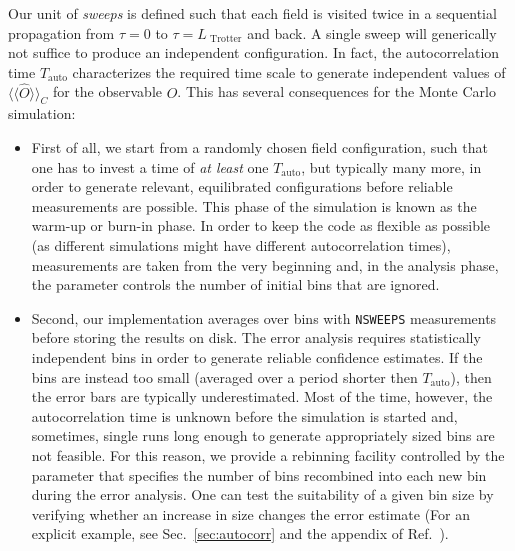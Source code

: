 Our unit of \textit{sweeps} is defined such that each field is visited twice in a sequential propagation from $\tau = 0$ to $\tau = L_{\text{ Trotter}}$ and back. A single sweep will  generically not suffice to produce an independent configuration.
In fact, the autocorrelation time $T_\mathrm{auto}$ characterizes the required time scale to generate independent values of $\langle\langle\hat{O}\rangle\rangle_C$ for the observable $O$. This has several consequences for the Monte Carlo simulation:
\begin{itemize}
	\item First of all, we start from a randomly chosen field configuration, such that one has to invest a time of \emph{at least} one $T_\mathrm{auto}$, but typically many more, in order to generate relevant, equilibrated configurations before reliable measurements are possible. This phase of the simulation is known as the warm-up or burn-in phase. In order to keep the code as flexible as possible (as different simulations might have different autocorrelation times), measurements are taken from the very beginning and, in the analysis phase, the parameter  controls the number of initial bins that are ignored.
	\item Second, our implementation averages over bins with \texttt{NSWEEPS} measurements before storing the results on disk. The  error analysis requires statistically  independent bins in order to generate reliable confidence estimates. If the bins are instead too small (averaged over a period shorter then $T_\mathrm{auto}$), then the error bars are typically underestimated. Most of the time, however, the autocorrelation time is unknown before the simulation is started and, sometimes, single runs long enough to generate appropriately sized bins are not feasible. For this reason, we provide a rebinning facility controlled by the parameter  that specifies the number of bins recombined into each new bin during the error analysis. One can test the suitability of a given bin size by verifying whether an increase in size changes the error estimate (For an explicit example, see Sec.~\ref{sec:autocorr} and the appendix of Ref.~\cite{Assaad02}).


\end{itemize}
